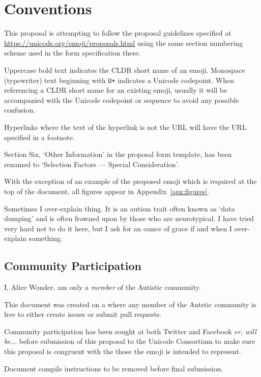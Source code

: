 \section*{Conventions} %

This proposal is attempting to follow the proposal guidelines specified at \url{https://unicode.org/emoji/proposals.html} using the same section numbering scheme used in the form specification there.

Uppercase bold text indicates the CLDR short name of an emoji. Monospace (typewriter) text beginning with \texttt{U+} indicates a Unicode codepoint. When referencing a CLDR short name for an existing emoji, usually it will be accompanied with the Unicode codepoint or sequence to avoid any possible confusion.

Hyperlinks where the text of the hyperlink is not the URL will have the URL specified in a footnote.

Section Six, `Other Information' in the proposal form template, has been renamed to `Selection Factors --- Special Consideration'.

With the exception of an example of the proposed emoji which is required at the top of the document, all figures appear in Appendix~\ref{apx:figures}.

Sometimes I over-explain thing. It is an autism trait often known as `data dumping' and is often frowned upon by those who are neurotypical. I have tried very hard not to do it here, but I ask for an ounce of grace if and when I over-explain something.

\subsection*{Community Participation}

I, Alice Wonder, am only a \emph{member} of the Autistic community.

This document was created on a  where any member of the Autstic community is free to either create issues or submit pull requests.

Community participation has been sought at both Twitter and Facebook \emph{er, will be...} before submission of this proposal to the Unicode Consortium to make sure this proposal is congruent with the those the emoji is intended to represent.

Document compile instructions to be removed before final submission.

